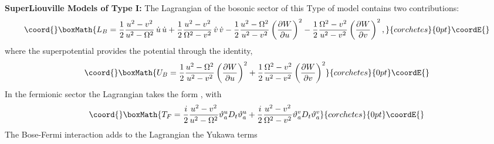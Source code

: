 \documentclass[a4paper,11pt,twoside]{article}
\begin{document}
\noindent \myHighlight{$\bullet$}\coordHE{} {\bf  SuperLiouville Models of Type I:} The
Lagrangian of the bosonic sector of this Type of model contains
two contributions:
\[\coord{}\boxMath{
L_B =\displaystyle\frac{1}{2}
\displaystyle\frac{u^2-v^2}{u^2-\Omega^2} \, \dot{u} \, \dot{u} +
\displaystyle\frac{1}{2} \displaystyle\frac{u^2-v^2}{\Omega^2-v^2}
\, \dot{v} \, \dot{v}- \displaystyle\frac{1}{2}
\displaystyle\frac{u^2-\Omega^2}{u^2-v^2} \left(
\displaystyle\frac{\partial W}{\partial u}
\right)^2-\displaystyle\frac{1}{2}
\displaystyle\frac{\Omega^2-v^2}{u^2-v^2} \left(
\displaystyle\frac{\partial W}{\partial v} \right)^2 ,
 }{corchetes}{0pt}\coordE{}\]
where the superpotential \coordHE{} provides the potential \coordHE{} through
the identity,
\[\coord{}\boxMath{
U_{B}= \displaystyle\frac{1}{2} \displaystyle\frac{u^2-\Omega^2}{u^2-v^2} \left( \displaystyle\frac{\partial W}{\partial u} \right)^2+\displaystyle\frac{1}{2} \displaystyle\frac{\Omega^2-v^2}{u^2-v^2} \left( \displaystyle\frac{\partial W}{\partial v} \right)^2
}{corchetes}{0pt}\coordE{}\]
In the fermionic sector the Lagrangian takes the form
\coordHE{}, with
\[\coord{}\boxMath{
T_F=\frac{i}{2} \frac{u^2-v^2}{u^2-\Omega^2}
\vartheta_a^u D_t \vartheta_a^u+ \frac{i}{2}
\frac{u^2-v^2}{\Omega^2-v^2} \vartheta_a^v D_t \vartheta_a^v
}{corchetes}{0pt}\coordE{}\]
The Bose-Fermi interaction adds to the Lagrangian the Yukawa terms
\end{document}
